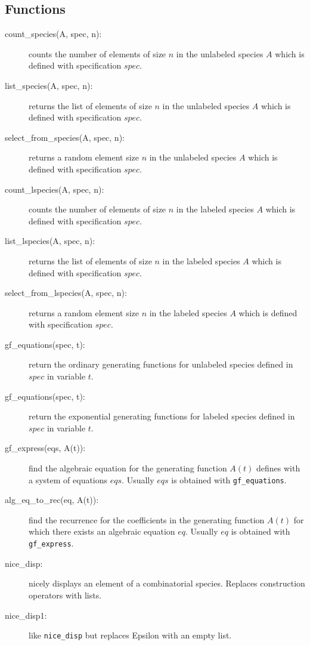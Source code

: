 \documentclass[11pt]{article}
\begin{document}
\subsection{Functions}

\begin{description}
  \item[count\_species(A, spec, n):] counts the number of elements of
    size $n$ in the unlabeled species $A$ which is defined with
    specification $spec$.
  \item[list\_species(A, spec, n):] returns the list of elements of
    size $n$ in the unlabeled species $A$ which is defined with
    specification $spec$.
  \item[select\_from\_species(A, spec, n):] returns a random element
    size $n$ in the unlabeled species $A$ which is defined with
    specification $spec$.
  \item[count\_lspecies(A, spec, n):] counts the number of elements of
    size $n$ in the labeled species $A$ which is defined with
    specification $spec$.
  \item[list\_lspecies(A, spec, n):] returns the list of elements of
    size $n$ in the labeled species $A$ which is defined with
    specification $spec$.
  \item[select\_from\_lspecies(A, spec, n):] returns a random element
    size $n$ in the labeled species $A$ which is defined with
    specification $spec$.
  \item[gf\_equations(spec, t):] return the ordinary generating
    functions for unlabeled species defined in $spec$ in variable $t$.
  \item[gf\_equations(spec, t):] return the exponential generating
    functions for labeled species defined in $spec$ in variable $t$.
  \item[gf\_express(eqs, A(t)):] find the algebraic equation for the
    generating function $A(t)$ defines with a system of equations
    $eqs$. Usually $eqs$ is obtained with \texttt{gf\_equations}.
  \item[alg\_eq\_to\_rec(eq, A(t)):] find the recurrence for the
    coefficients in the generating function $A(t)$ for which there
    exists an algebraic equation $eq$. Usually $eq$ is obtained with
    \texttt{gf\_express}.
   \item[nice\_disp:] nicely displays an element of a combinatorial
   	species. Replaces construction operators with lists.
   \item[nice\_disp1:] like \verb|nice_disp| but replaces Epsilon with
   	an empty list.
\end{description}
\end{document}
